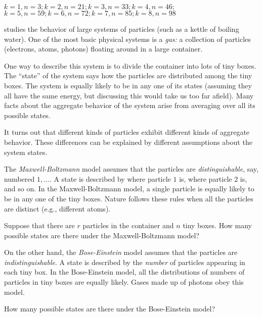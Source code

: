 \documentclass[12pt,twoside]{article}
\begin{document}
\begin{problems}
\begin{problemparts}
{$k = 1, n = 3; k = 2, n = 21;  k = 3, n = 33; k = 4, n = 46;$ \\
$k = 5, n = 59; k = 6, n = 72; k = 7, n = 85; k = 8, n = 98$
}

\end{problemparts}

 studies the behavior of large systems of
particles (such as a kettle of boiling water).  One of the most basic
physical systems is a {\em gas:} a collection of particles (electrons,
atoms, photons) floating around in a large container. 

One way to describe this system is to divide the container into lots
of tiny boxes.  
The ``state'' of the system says how the particles are distributed among
the tiny boxes. 
The system is equally likely to be in any one of its states (assuming
they all have the same energy, but discussing this would take us too
far afield).  
Many facts about the aggregate behavior of the system arise from
averaging over all its possible states.

It turns out that different kinds of particles exhibit different kinds
of aggregate behavior.
These differences can be explained by different assumptions about the 
system states.

The {\em Maxwell-Boltzmann\/} model assumes that the particles are 
{\em distinguishable}, say, numbered $1,\ldots$.
A state is described by where particle $1$ is, where particle $2$ is,
and so on. 
In the Maxwell-Boltzmann model, a single particle is equally
likely to be in any one of the tiny boxes.
Nature follows these rules when all the particles are
distinct (e.g., different atoms).

\bparts

\ppart Suppose that there are $r$ particles in
the container and $n$ tiny boxes.
How many possible states are there under the Maxwell-Boltzmann model?


On the other hand, the {\em Bose-Einstein\/} model assumes that the
particles are {\em indistinguishable\/}.
A state is described by the {\em number\/} of particles appearing in
each tiny box. 
In the Bose-Einstein model, all the distributions of numbers of
particles in tiny boxes are equally likely.
Gases made up of photons obey this model.

\ppart How many possible states are there under the Bose-Einstein model?


\end{problems}
\end{document}
